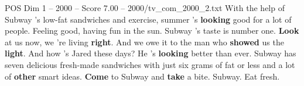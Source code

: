 \begin{textsample}{POS Dim 1 – 2000 – Score 7.00 – 2000/tv\_com\_2000\_2.txt}  \label{ex:f1_pos_071}
With the help of Subway 's low-fat sandwiches and exercise, summer 's \textbf{looking} good for a lot of people.
Feeling good, having fun in the sun.
Subway 's taste is number one. \textbf{Look} at us now, we 're living \textbf{right}.
And we owe it to the man who \textbf{showed} us the \textbf{light}.
And how 's Jared these days?
He 's \textbf{looking} better than ever.
Subway has seven delicious fresh-made sandwiches with just six grams of fat or less and a lot of \textbf{other} smart ideas. \textbf{Come} to Subway and \textbf{take} a bite.
Subway.
Eat fresh.

\end{textsample}
